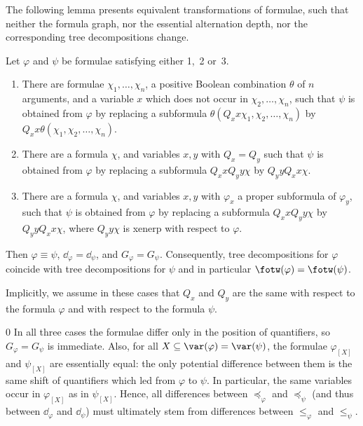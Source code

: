 \documentclass{LMCS}
\newcommand{\gfi}{G_{\varphi}}
\renewcommand{\phi}{\varphi}
\newcommand{\ad}{\dd_{\varphi}}
\begin{document}
The following lemma presents equivalent transformations of formulae, 
such that neither the formula graph, nor the essential alternation depth, 
nor the corresponding tree decompositions change. 

\begin{lem}\label{lem:replacements}
Let $\phi$ and $\psi$ be formulae satisfying either 1,~2 or~3. 
\begin{enumerate}[\em(1)]
\item There are formulae $\chi_1,\ldots,\chi_n$, 
  a positive Boolean combination $\theta$ of $n$ arguments, 
  and a variable $x$ which does not occur in $\chi_2,\ldots,\chi_n$, 
  such that $\psi$ is obtained from $\phi$ by replacing 
  a subformula $\theta(Q_x x\chi_1,\chi_2,\ldots,\chi_n)$ 
  by $Q_x x\theta(\chi_1,\chi_2,\ldots,\chi_n)$. 

\item There are a formula $\chi$, and variables $x,y$ with $Q_x=Q_y$ 
  such that $\psi$ is obtained from $\phi$ by replacing 
  a subformula $Q_xxQ_yy\chi$ by $Q_yyQ_xx\chi$. 

\item There are a formula $\chi$, 
  and variables $x,y$ with $\phi_x$ a proper subformula of $\phi_y$, 
  such that $\psi$ is obtained from $\phi$ by replacing 
  a subformula $Q_xxQ_yy\chi$ by $Q_yyQ_xx\chi$, 
  where $Q_yy\chi$ is xenerp with respect to $\phi$. 
\end{enumerate}
Then $\phi\equiv\psi$, $\ad=\dd_{\psi}$, and $\gfi=G_{\psi}$. 
Consequently, 
tree decompositions for $\phi$ coincide with tree decompositions for $\psi$ 
and in particular $\fotw(\phi)=\fotw(\psi)$. 

Implicitly, we assume in these cases that $Q_x$ and $Q_y$ 
are the same with respect to the formula $\phi$ 
and with respect to the formula $\psi$. 
\end{lem}

\proof
\setcounter{clam}0
In all three cases the formulae differ only in the position of quantifiers, 
so $\gfi=G_{\psi}$ is immediate. 
Also, for all $X\subseteq\var(\phi)=\var(\psi)$, 
the formulae $\phi_{[X]}$ and $\psi_{[X]}$ are essentially equal: 
the only potential difference between them 
is the same shift of quantifiers which led from $\phi$ to $\psi$. 
In particular, the same variables occur in $\phi_{[X]}$ as in $\psi_{[X]}$. 
Hence, all differences between $\preceq_{\phi}$ and $\preceq_{\psi}$ 
(and thus between $\ad$ and $\dd_{\psi}$) 
must ultimately stem from differences between $\leq_{\phi}$ and $\leq_{\psi}$. 
\end{document}
